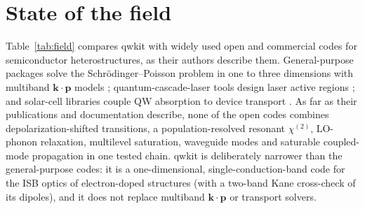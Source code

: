 \documentclass[11pt]{article}
\newcommand{\chitwo}{\chi^{(2)}}
\begin{document}
\section{State of the field}
Table~\ref{tab:field} compares qwkit with widely used open and commercial codes for semiconductor heterostructures, as their authors describe them. General-purpose packages solve the Schr\"odinger--Poisson problem in one to three dimensions with multiband $\mathbf{k}\cdot\mathbf{p}$ models \cite{Birner2007,Hebal2021,Beugeling2025}; quantum-cascade-laser tools design laser active regions \cite{ErwinJr2}; and solar-cell libraries couple QW absorption to device transport \cite{AlonsoAlvarez2018,Gaury2019}. As far as their publications and documentation describe, none of the open codes combines depolarization-shifted transitions, a population-resolved resonant $\chitwo$, LO-phonon relaxation, multilevel saturation, waveguide modes and saturable coupled-mode propagation in one tested chain. qwkit is deliberately narrower than the general-purpose codes: it is a one-dimensional, single-conduction-band code for the ISB optics of electron-doped structures (with a two-band Kane cross-check of its dipoles), and it does not replace multiband $\mathbf{k}\cdot\mathbf{p}$ or transport solvers.
\end{document}
